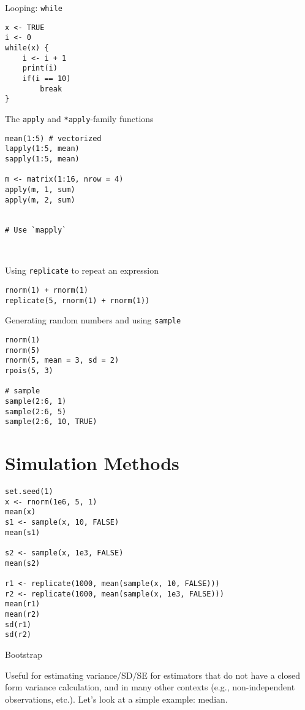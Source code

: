 \documentclass[a4paper,12pt]{article}
\begin{document}
Looping: \texttt{while}

\begin{lstlisting}
x <- TRUE
i <- 0
while(x) {
    i <- i + 1
    print(i)
    if(i == 10)
        break
}
\end{lstlisting}


The \texttt{apply} and \texttt{*apply}-family functions


\begin{lstlisting}
mean(1:5) # vectorized
lapply(1:5, mean)
sapply(1:5, mean)

m <- matrix(1:16, nrow = 4)
apply(m, 1, sum)
apply(m, 2, sum)


# Use `mapply`



\end{lstlisting}


Using \texttt{replicate} to repeat an expression

\begin{lstlisting}
rnorm(1) + rnorm(1)
replicate(5, rnorm(1) + rnorm(1))
\end{lstlisting}



Generating random numbers and using \texttt{sample}

\begin{lstlisting}
rnorm(1)
rnorm(5)
rnorm(5, mean = 3, sd = 2)
rpois(5, 3)

# sample
sample(2:6, 1)
sample(2:6, 5)
sample(2:6, 10, TRUE)
\end{lstlisting}



\clearpage
\section{Simulation Methods}






\begin{lstlisting}
set.seed(1)
x <- rnorm(1e6, 5, 1)
mean(x)
s1 <- sample(x, 10, FALSE)
mean(s1)

s2 <- sample(x, 1e3, FALSE)
mean(s2)

r1 <- replicate(1000, mean(sample(x, 10, FALSE)))
r2 <- replicate(1000, mean(sample(x, 1e3, FALSE)))
mean(r1)
mean(r2)
sd(r1)
sd(r2)
\end{lstlisting}

Bootstrap

Useful for estimating variance/SD/SE for estimators that do not have a closed form variance calculation, and in many other contexts (e.g., non-independent observations, etc.). Let's look at a simple example: median.
\end{document}
